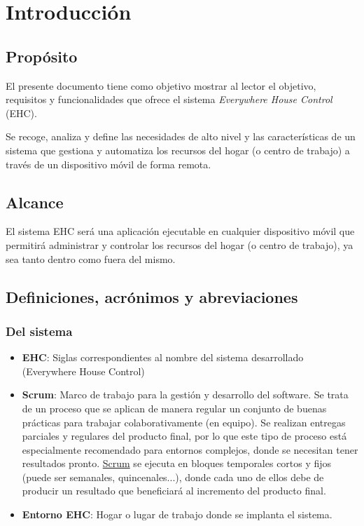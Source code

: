\chapter{Introducción}

\section{Propósito}
    El presente documento tiene como objetivo mostrar al lector el objetivo, requisitos y funcionalidades que ofrece el sistema \textit{Everywhere House Control} (EHC). \par
    Se recoge, analiza y define las necesidades de alto nivel y las características de un sistema que gestiona y automatiza los recursos del hogar (o centro de trabajo) a través de un dispositivo móvil de forma remota.

\section{Alcance}
    El sistema EHC será una aplicación ejecutable en cualquier dispositivo móvil que permitirá administrar y controlar los recursos del hogar (o centro de trabajo), ya sea tanto dentro como fuera del mismo.

\section{Definiciones, acrónimos y abreviaciones}
    \subsection{Del sistema}
        \begin{itemize}
            \item { \bf EHC}: Siglas correspondientes al nombre del sistema desarrollado (Everywhere House Control)
            \item { \bf Scrum}: Marco de trabajo para la gestión y desarrollo del software. Se trata de un proceso que se aplican de manera regular un conjunto de buenas prácticas para trabajar colaborativamente (en equipo). Se realizan entregas parciales y regulares del producto final, por lo que este tipo de proceso está especialmente recomendado para entornos complejos, donde se necesitan tener resultados pronto. \href{http://es.wikipedia.org/wiki/Scrum}{Scrum} se ejecuta en bloques temporales cortos y fijos (puede ser semanales, quincenales...), donde cada uno de ellos debe de producir un resultado que beneficiará al incremento del producto final. 
            \item { \bf Entorno EHC}: Hogar o lugar de trabajo donde se implanta el sistema.
        \end{itemize}
